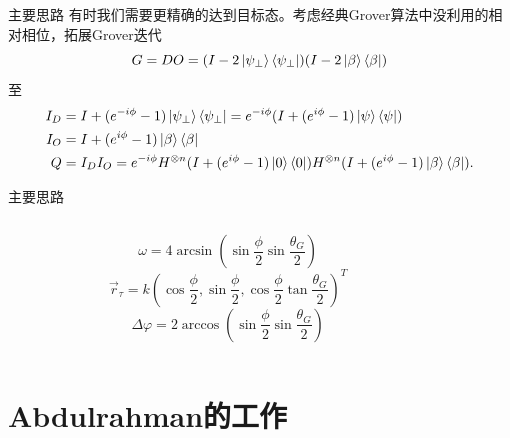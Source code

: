 \documentclass{beamer}
\begin{document}
\begin{frame}{主要思路}
    有时我们需要更精确的达到目标态。考虑经典Grover算法中没利用的相对相位，拓展Grover迭代
    \begin{equation}
        G=DO=(I-2\ket{\psi_{\perp}}\bra{\psi_{\perp}})(I-2\ket{\beta}\bra{\beta})
    \end{equation}
    至
    \begin{equation*}
        \begin{split}
            I_{D} & = I+(e^{-i\phi}-1)\ket{\psi_{\perp}}\bra{\psi_{\perp}} = e^{-i\phi}(I+(e^{i\phi}-1)\ket{\psi}\bra{\psi})                   \\
            I_{O} & = I+(e^{i\phi}-1)\ket{\beta}\bra{\beta}                                                                                    \\
            Q     & = I_{D}I_{O} = e^{-i\phi}H^{\otimes n}(I+(e^{i\phi}-1)\ket{0}\bra{0})H^{\otimes n}(I+(e^{i\phi}-1)\ket{\beta}\bra{\beta}).
        \end{split}
    \end{equation*}
\end{frame}

\begin{frame}{主要思路}
    \begin{columns}
        \begin{figure}[h]
            \centering
            \resizebox{\textwidth}{!}{}
        \end{figure}
        \begin{equation*}
            \omega=4\arcsin(\sin\frac{\phi}{2}\sin\frac{\theta_{G}}{2})
        \end{equation*}
        \begin{equation*}
            \vec{r}_{\tau}= k(\cos\frac{\phi}{2},\sin\frac{\phi}{2},\cos\frac{\phi}{2}\tan\frac{\theta_{G}}{2})^{T}
        \end{equation*}
        \begin{equation*}
            \Delta\varphi=2\arccos(\sin\frac{\phi}{2}\sin\frac{\theta_{G}}{2})
        \end{equation*}
    \end{columns}
\end{frame}



\section{Abdulrahman的工作}
\end{document}
